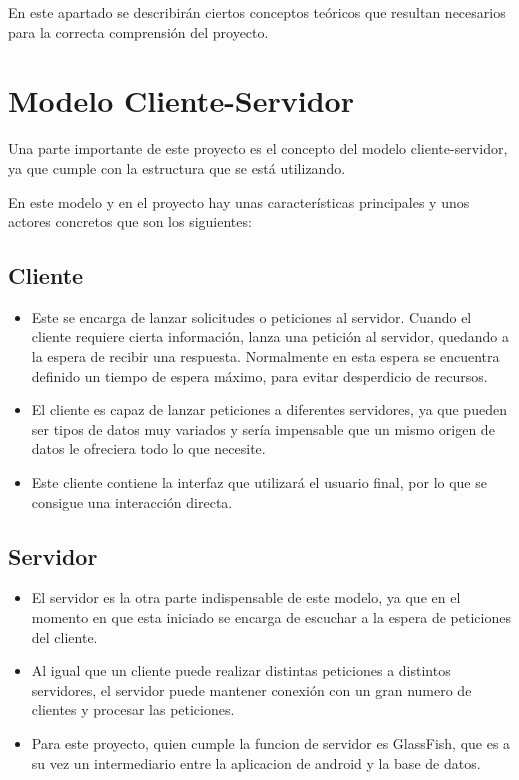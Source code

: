 
En este apartado se describirán ciertos conceptos teóricos que resultan necesarios para la correcta comprensión del proyecto.

\section{Modelo Cliente-Servidor}

Una parte importante de este proyecto es el concepto del modelo cliente-servidor, ya que cumple con la estructura que se está utilizando. \cite{cs1} \cite{cs2}

En este modelo y en el proyecto hay unas características principales y unos actores concretos que son los siguientes:

\subsection{Cliente}
\begin{itemize}
\item Este se encarga de lanzar solicitudes o peticiones al servidor. Cuando el cliente requiere cierta información, lanza una petición al servidor, quedando a la espera de recibir una respuesta. Normalmente en esta espera se encuentra definido un tiempo de espera máximo, para evitar desperdicio de recursos.

\item El cliente es capaz de lanzar peticiones a diferentes servidores, ya que pueden ser tipos de datos muy variados y sería impensable que un mismo origen de datos le ofreciera todo lo que necesite.

\item Este cliente contiene la interfaz que utilizará el usuario final, por lo que se consigue una interacción directa.
\end{itemize}

\subsection{Servidor}
\begin{itemize}
\item El servidor es la otra parte indispensable de este modelo, ya que en el momento en que esta iniciado se encarga de escuchar a la espera de peticiones del cliente.

\item Al igual que un cliente puede realizar distintas peticiones a distintos servidores, el servidor puede mantener conexión con un gran numero de clientes y procesar las peticiones. 

\item Para este proyecto, quien cumple la funcion de servidor es GlassFish, que es a su vez un intermediario entre la aplicacion de android y la base de datos.
\end{itemize}

